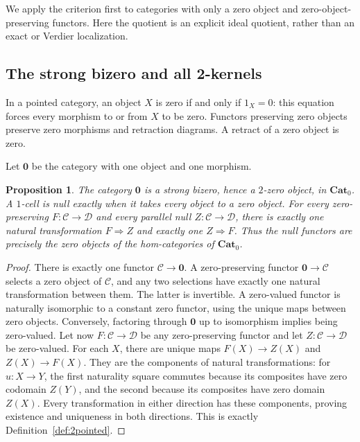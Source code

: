\documentclass[11pt,reqno,a4paper]{amsart}
\newtheorem{proposition}[theorem]{Proposition}
\theoremstyle{definition}
\theoremstyle{remark}
\newcommand{\C}{\mathcal{C}}
\newcommand{\D}{\mathcal{D}}
\newcommand{\0}{\mathbf{0}}
\renewcommand{\1}{\mathbf{1}}
\newcommand{\Pt}{\mathbf{Cat}_{0}}
\newcommand{\Zcat}{\mathbf 0}
\begin{document}
We apply the criterion first to categories with only a zero object
and zero-object-preserving functors. Here the quotient is an explicit
ideal quotient, rather than an exact or Verdier localization.

\subsection{The strong bizero and all 2-kernels}

In a pointed category, an object $X$ is zero if and only if $1_X=0$:
this equation forces every morphism to or from $X$ to be zero. Functors
preserving zero objects preserve zero morphisms and retraction diagrams.
A retract of a zero object is zero.

Let $\Zcat$ be the category with one object and one morphism.

\begin{proposition}\label{prop:pointedzero}
The category $\Zcat$ is a strong bizero, hence a $2$-zero object,
in $\Pt$. A $1$-cell is null exactly when it takes every object to
a zero object. For every zero-preserving $F:\C\to\D$ and every
parallel null $Z:\C\to\D$, there is exactly one natural
transformation $F\Rightarrow Z$ and exactly one $Z\Rightarrow F$.
Thus the null functors are precisely the zero objects of the
hom-categories of $\Pt$.
\end{proposition}
\begin{proof}
There is exactly one functor $\C\to\Zcat$. A zero-preserving functor
$\Zcat\to\C$ selects a zero object of $\C$, and any two selections
have exactly one natural transformation between them. The latter is
invertible. A zero-valued functor is naturally isomorphic to a constant
zero functor, using the unique maps between zero objects. Conversely,
factoring through $\Zcat$ up to isomorphism implies being zero-valued.
Let now $F:\C\to\D$ be any zero-preserving functor and let
$Z:\C\to\D$ be zero-valued. For each $X$, there are unique maps
$F(X)\to Z(X)$ and $Z(X)\to F(X)$. They are the components of
natural transformations: for $u:X\to Y$, the first naturality
square commutes because its composites have zero codomain $Z(Y)$,
and the second because its composites have zero domain $Z(X)$.
Every transformation in either direction has these components,
proving existence and uniqueness in both directions. This is exactly
Definition~\ref{def:2pointed}.
\end{proof}
\end{document}
